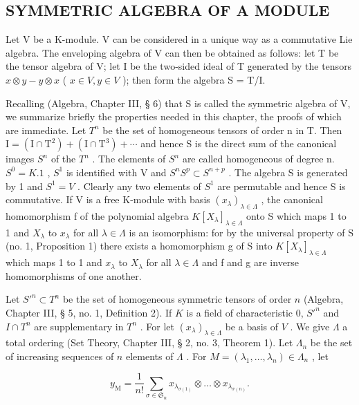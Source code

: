 \subsection{SYMMETRIC ALGEBRA OF A MODULE}

Let V be a K-module. V can be considered in a unique way as a commutative Lie algebra. The enveloping algebra of V can then be obtained as follows: let T be the tensor algebra of V; let I be the two-sided ideal of T generated by the tensors \(x \otimes y - y \otimes x\) ( \(x \in V, y \in V\) ); then form the algebra S = T/I.

Recalling (Algebra, Chapter III, § 6) that S is called the symmetric algebra of V, we summarize briefly the properties needed in this chapter, the proofs of which are immediate. Let \(T^{n}\) be the set of homogeneous tensors of order n in T. Then \(\mathrm{I} = (\mathrm{I} \cap \mathrm{T}^{2}) + (\mathrm{I} \cap \mathrm{T}^{3}) + \cdots\) and hence S is the direct sum of the canonical images \(S^{n}\) of the \(T^{n}\) . The elements of \(S^{n}\) are called homogeneous of degree n.~\(S^{0} = K.1\) , \(S^{1}\) is identified with V and \(S^{n}S^{p} \subset S^{n+p}\) . The algebra S is generated by 1 and \(S^{1} = V\) . Clearly any two elements of \(S^{1}\) are permutable and hence S is commutative. If V is a free K-module with basis \((x_{\lambda})_{\lambda \in \Lambda}\) , the canonical homomorphism f of the polynomial algebra \(K[X_{\lambda}]_{\lambda \in \Lambda}\) onto S which maps 1 to 1 and \(X_{\lambda}\) to \(x_{\lambda}\) for all \(\lambda \in \Lambda\) is an isomorphism: for by the universal property of S (no. 1, Proposition 1) there exists a homomorphism g of S into \(K[X_{\lambda}]_{\lambda \in \Lambda}\) which maps 1 to 1 and \(x_{\lambda}\) to \(X_{\lambda}\) for all \(\lambda \in \Lambda\) and f and g are inverse homomorphisms of one another.

Let \(S'^{n} \subset T^n\) be the set of homogeneous symmetric tensors of order \(n\) (Algebra, Chapter III, § 5, no. 1, Definition 2). If \(K\) is a field of characteristic 0, \(S'^{n}\) and \(I \cap T^n\) are supplementary in \(T^n\) . For let \((x_{\lambda})_{\lambda \in \Lambda}\) be a basis of \(V\) . We give \(\Lambda\) a total ordering (Set Theory, Chapter III, § 2, no. 3, Theorem 1). Let \(\Lambda_n\) be the set of increasing sequences of \(n\) elements of \(\Lambda\) . For \(M = (\lambda_1, \ldots, \lambda_n) \in \Lambda_n\) , let

\[
y _ {\mathrm{M}} = \frac {1}{n !} \sum_ {\sigma \in \mathfrak {S} _ {n}} x _ {\lambda_ {\sigma (1)}} \otimes \dots \otimes x _ {\lambda_ {\sigma (n)}}.
\]

